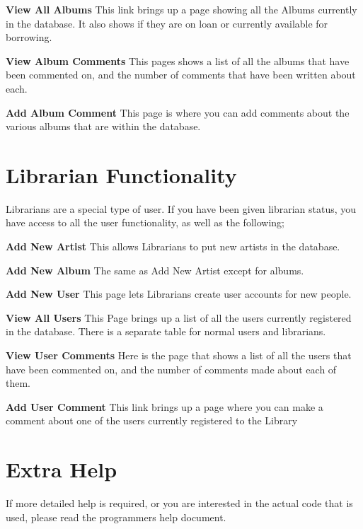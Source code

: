 \documentclass{article}
\begin{document}
\begin{description}
\item{\bf{View All Albums}}
This link brings up a page showing all the Albums currently in the database. It also shows if they are on loan or currently available for borrowing.
\item{\bf{View Album Comments}}
This pages shows a list of all the albums that have been commented on, and the number of comments that have been written about each.
\item{\bf{Add Album Comment}}
This page is where you can add comments about the various albums that are within the database.
\end{description}

\section{Librarian Functionality}
Librarians are a special type of user. If you have been given librarian status, you have access to all the user functionality, as well as the following;
\begin{description}
\item{\bf{Add New Artist}}
This allows Librarians to put new artists in the database.
\item{\bf{Add New Album}}
The same as Add New Artist except for albums.
\item{\bf{Add New User}}
This page lets Librarians create user accounts for new people.
\item{\bf{View All Users}}
This Page brings up a list of all the users currently registered in the database. There is a separate table for normal users and librarians.
\item{\bf{View User Comments}}
Here is the page that shows a list of all the users that have been commented on, and the number of comments made about each of them.
\item{\bf{Add User Comment}}
This link brings up a page where you can make a comment about one of the users currently registered to the Library
\end{description}
\section{Extra Help}
If more detailed help is required, or you are interested in the actual code that is used, please read the programmers help document.
\end{document}
